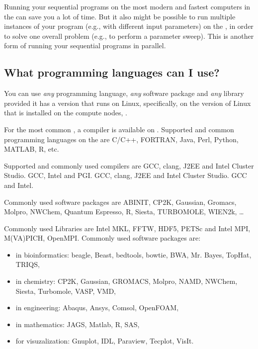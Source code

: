 Running your sequential programs on the most modern and fastest computers in
the \hpc can save you a lot of time.  But it also might be possible to run
multiple instances of your program (e.g., with different input parameters) on
the \hpc, in order to solve one overall problem (e.g., to perform a parameter
sweep). This is another form of running your sequential programs in parallel.

\subsection{What programming languages can I use?}
\label{sec:what-programming-languages-can-i-use}

You can use \emph{any} programming language, \emph{any} software package and
\emph{any} library provided it has a version that runs on Linux, specifically,
on the version of Linux that is installed on the compute nodes,
\operatingsystembase.

For the most common , a compiler is available on
\operatingsystem. Supported and common programming languages on the \hpc are
C/C++, FORTRAN, Java, Perl, Python, MATLAB, R, etc.

Supported and commonly used compilers are
\ifantwerpen
GCC, clang, J2EE and Intel Cluster Studio.
\fi
\ifleuven
GCC, Intel and PGI.
\fi
\ifbrussel
GCC, clang, J2EE and Intel Cluster Studio.
\fi
\ifgent
GCC and Intel.
\fi


\ifantwerpen
Commonly used software packages are ABINIT, CP2K, Gaussian, Gromacs, Molpro,
NWChem, Quantum Espresso, R, Siesta, TURBOMOLE, WIEN2k, \ldots

Commonly used Libraries are Intel MKL, FFTW, HDF5, PETSc and Intel MPI,
M(VA)PICH, OpenMPI.
\fi
\ifleuven
Commonly used software packages are:
\begin{itemize}
\item{in bioinformatics: beagle, Beast, bedtools, bowtie, BWA, Mr. Bayes, TopHat, TRIQS,}
\item{in chemistry: CP2K, Gaussian, GROMACS, Molpro, NAMD, NWChem, Siesta, Turbomole, VASP, VMD,}
\item{in engineering: Abaqus, Ansys, Comsol, OpenFOAM,}
\item{in mathematics: JAGS, Matlab, R, SAS,}
\item{for visuzalization: Gnuplot, IDL, Paraview, Tecplot, VisIt.}
\end{itemize}


